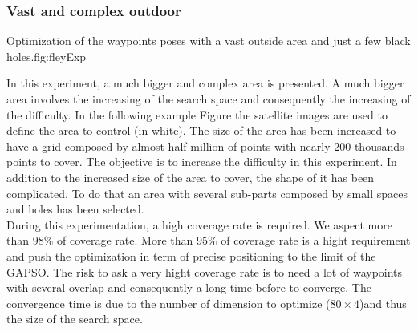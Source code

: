 		\subsubsection{Vast and complex outdoor}\label{sec:fey_map}

\begin{mfigures}[!]{Optimization of the waypoints poses with a vast outside area and just a few  black holes.}{fig:fleyExp} \centering
{}
\hspace{1cm}
\hspace{1cm}
\tabsimuposeFley
\end{mfigures}


In this experiment, a much bigger and complex area is presented.
	A much bigger area involves the increasing of the search space and consequently the increasing of the difficulty. 
In the following example Figure  the satellite images are used to define the area to control (in white). The size of the area has been increased to have a grid composed by almost half million of points with nearly 200 thousands points to cover. 
The objective is to increase the difficulty in this experiment. In addition to the increased size of the area to cover, the shape of it has been complicated. To do that an area with several sub-parts composed by small spaces and holes has been selected.\\
During this experimentation, a high coverage rate is required. We aspect more than $98\%$ of coverage rate. More than $95\%$ of coverage rate is a hight requirement and push the optimization in term of precise positioning to the limit of the GAPSO. The risk to ask a very hight coverage rate is to need a lot of waypoints with several overlap and consequently a long time before to converge.  The convergence time is due to the number of dimension to optimize  ($80\times 4 $)and  thus the size of the search space.


